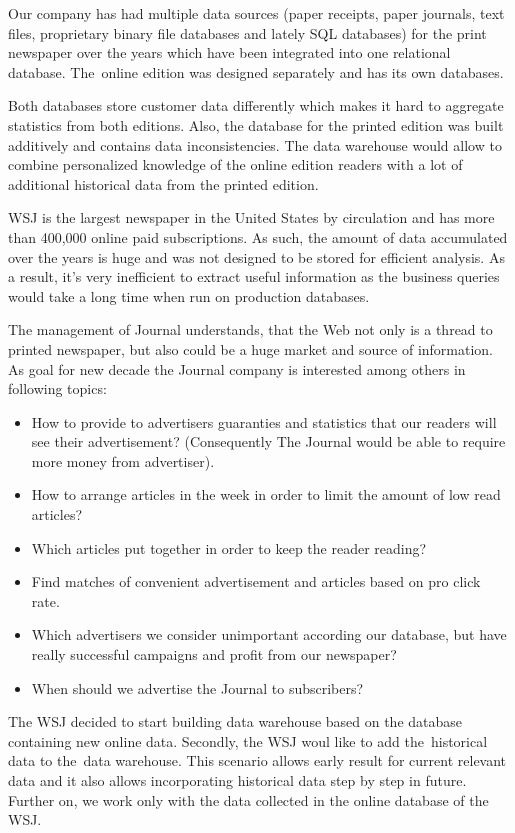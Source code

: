  
Our company has had multiple data sources (paper receipts, paper journals, text files, proprietary binary file databases and lately SQL databases) for the print newspaper over the years which have been integrated into one relational database. 
The~online edition was designed separately and has its own databases. 

Both databases store customer data differently which makes it hard to aggregate statistics from both editions. Also, the database for the printed edition was built additively and contains data inconsistencies. The data warehouse would allow to combine personalized knowledge of the online edition readers with a lot of additional historical data from the printed edition.


WSJ is the largest newspaper in the United States by circulation and has more than 400,000 online paid subscriptions. As such, the amount of data accumulated over the years is huge and was not designed to be stored for efficient analysis. As a result, it's very inefficient to extract useful information as the business queries would take a long time when run on production databases.

The management of Journal understands, that the Web not only is a thread to printed newspaper, but also could be a huge market and source of information. As goal for new decade the Journal company is interested among others in following topics:
\begin{itemize}
    \item How to provide to advertisers guaranties and statistics that our readers will see their advertisement? (Consequently The Journal would be able to require more money from advertiser).
    \item How to arrange articles in the week in order to limit the amount of low read articles?
    \item Which articles put together in order to keep the reader reading?
    \item Find matches of convenient advertisement and articles based on pro click rate.
    \item Which advertisers we consider unimportant according our database, but have really successful campaigns and profit from our newspaper?
    \item When should we advertise the Journal to subscribers?
\end{itemize}

The WSJ decided to start building data warehouse based on the database containing new online data. Secondly, the WSJ woul like to add the~historical data to the~data warehouse. This scenario allows early result for current relevant data and it also allows incorporating historical data step by step in future.
Further on, we work only with the data collected in the online database of the WSJ.
